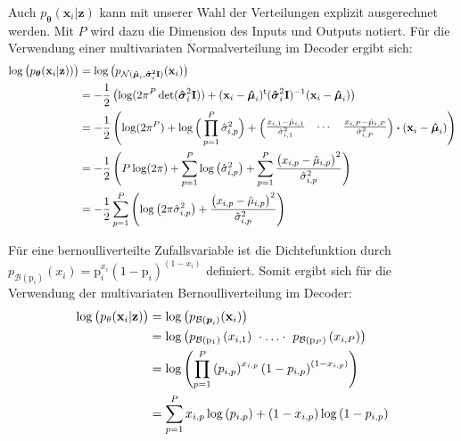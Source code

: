 \documentclass[12pt]{article}
\newcommand{\pdec}{p_{\boldsymbol\theta}(\mathbf{x}_i|\mathbf{z})}
\begin{document}
	Auch $\pdec$ kann mit unserer Wahl der Verteilungen explizit ausgerechnet werden.
	Mit $P$ wird dazu die Dimension des Inputs und Outputs notiert.
	Für die Verwendung einer multivariaten Normalverteilung im Decoder ergibt sich:
	\begin{align*}
	\log\big(\pdec)\big) &=  \log\big(p_{\mathcal{N}(\boldsymbol{\hat{\mu}}_{i},\boldsymbol{\hat{\sigma}}_{i}^{2}\textbf{I})}(\textbf{x}_{i})\big)\notag \\
	&= -\frac{1}{2}\left(\log(2\pi^{P} \det(\boldsymbol{\hat{\sigma}}_{i}^{2}\textbf{I}))+(\textbf{x}_{i}-\boldsymbol{\hat{\mu}}_{i})^{\mathsf{t}}(\boldsymbol{\hat{\sigma}}_{i}^{2}\textbf{I})^{-1}(\textbf{x}_{i}-\boldsymbol{\hat{\mu}}_{i})\right) \notag \\
	&= -\frac{1}{2}\left(\log(2\pi^{P})+\log\Big( \prod_{p=1}^{P}\hat{\sigma}_{i,p}^{2}\Big)+  \begin{pmatrix}  \frac{x_{i,1}-\hat{\mu}_{i,1}}{\hat{\sigma}_{i,1}^{2}}&\cdots& \frac{x_{i,P}-\hat{\mu}_{i,P}}{\hat{\sigma}_{i,P}^{2}}\end{pmatrix} 
	\boldsymbol{\cdot}(\textbf{x}_{i}-\boldsymbol{\hat{\mu}}_{i})\right) \notag \\
	&= -\frac{1}{2}\left(P\log(2\pi)+\sum_{p=1}^{P}\log\left( \hat{\sigma}_{i,p}^{2}\right)+ 
	\sum_{p=1}^{P}\frac{\big(x_{i,p}-\hat{\mu}_{i,p}\big)^{2}}{\hat{\sigma}_{i,p}^{2}}\right) \notag \\
	&= -\frac{1}{2}\sum_{p=1}^{P} \left(\log\left(2\pi \hat{\sigma}_{i,p}^{2}\right) + \frac{\big(x_{i,p}-\hat{\mu}_{i,p}\big)^{2}}{\hat{\sigma}_{i,p}^{2}}\right)
	\end{align*}
	
	Für eine bernoulliverteilte Zufallsvariable ist die Dichtefunktion  durch $p_{\mathcal{B}(\mathrm{p}_{i})}(x_{i}) = \mathrm{p}_{i}^{x_{i}}(1-\mathrm{p}_{i})^{(1-x_{i})}$ definiert. Somit ergibt sich für die Verwendung der multivariaten Bernoulliverteilung im Decoder: \\
	\begin{align*}
	\log\big(p_{\theta}(\textbf{x}_{i}|\textbf{z})\big) &=  \log\big(p_{\mathcal{B}(\boldsymbol{p}_{i})}(\textbf{x}_{i})\big)\notag \\
	&= \log\left(p_{\mathcal{B}(\mathrm{p}_{1})}\left(x_{i,1}\right)\ \cdot\ldots\cdot \ p_{\mathcal{B}(\mathrm{p}_{P})}\left(x_{i,P}\right)\right)\notag \\
	&= \log\left(\prod_{p=1}^{P}\left(p_{i,p}\right)^{x_{i,p}}\left(1-p_{i,p}\right)^{\left(1-x_{i,p}\right)}\right) \notag \\
	&=  \sum_{p=1}^{P}x_{i,p}\log\left(p_{i,p}\right)+\left(1-x_{i,p}\right)\log\left(1-p_{i,p}\right)
	\end{align*}			
\end{document}
